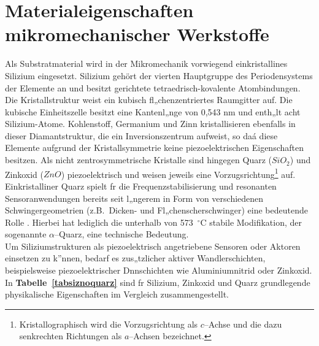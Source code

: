 \section[Materialeigenschaften]
{Materialeigenschaften mikromechanischer Werkstoffe}
\label{materialeigenschaften}

Als Substratmaterial wird in der Mikromechanik vorwiegend
einkristallines Silizium eingesetzt.  Silizium gehört der vierten
Hauptgruppe
des Periodensystems der Elemente an und besitzt gerichtete
tetraedrisch-kovalente Atombindungen.  Die Kristallstruktur weist ein
kubisch fl„chenzentriertes Raumgitter auf.  Die kubische Einheitszelle
besitzt eine Kantenl„nge von 0,543 nm und enth„lt acht Silizium-Atome.
Kohlenstoff, Germanium und Zinn kristallisieren ebenfalls in dieser
Diamantstruktur, die ein Inversionszentrum aufweist, so daá diese Elemente
aufgrund der Kristallsymmetrie keine piezoelektrischen Eigenschaften
besitzen.
Als nicht zentrosymmetrische Kristalle sind hingegen Quarz ($SiO_{2}$)
und Zinkoxid ($ZnO$) piezoelektrisch und weisen jeweils eine
Vorzugsrichtung\footnote{Kristallographisch wird die Vorzugsrichtung
als $c$--Achse und die dazu senkrechten Richtungen als $a$--Achsen
bezeichnet.} auf. Einkristalliner Quarz spielt fr die
Frequenzstabilisierung und resonanten Sensoranwendungen bereits seit
l„ngerem in Form von verschiedenen Schwingergeometrien (z.B.\ Dicken-
und Fl„chenscherschwinger) eine bedeutende Rolle \cite{Bue91b}. Hierbei hat
lediglich die unterhalb von 573~$^\circ$C stabile Modifikation, der
sogenannte $ \alpha $--Quarz, eine technische Bedeutung.\\
%
Um Siliziumstrukturen als piezoelektrisch angetriebene Sensoren oder
Aktoren einsetzen zu k”nnen, bedarf es zus„tzlicher aktiver Wandlerschichten,
beispielsweise piezoelektrischer Dnnschichten wie Aluminiumnitrid oder
Zinkoxid. In {\bf Tabelle~\ref{tabsiznoquarz}} sind fr Silizium, Zinkoxid
und Quarz grundlegende physikalische Eigenschaften im Vergleich
zusammengestellt.
